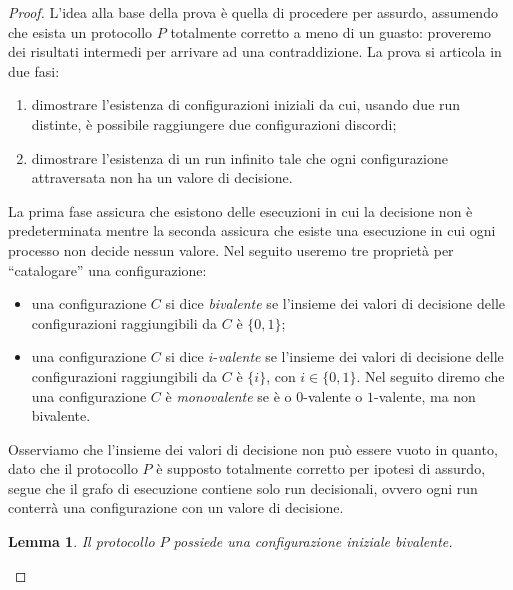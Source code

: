 \documentclass{article}
\newtheorem{lemma}{Lemma}
\begin{document}
\begin{proof}
  L'idea alla base della prova è quella di procedere per assurdo,
  assumendo che esista un protocollo $P$ totalmente corretto a meno di
  un guasto: proveremo dei risultati intermedi per arrivare ad una
  contraddizione. La prova si articola in due fasi:
  \begin{enumerate}
  \item dimostrare l'esistenza di configurazioni iniziali da cui,
    usando due run distinte, è possibile raggiungere due
    configurazioni discordi;
  \item dimostrare l'esistenza di un run infinito tale che ogni
    configurazione attraversata non ha un valore di decisione.
  \end{enumerate}
  La prima fase assicura che esistono delle esecuzioni in cui la
  decisione non è predeterminata mentre la seconda assicura che esiste
  una esecuzione in cui ogni processo non decide nessun valore.  Nel
  seguito useremo tre propriet\`a per ``catalogare'' una
  configurazione:
  \begin{itemize}
  \item una configurazione $C$ si dice \emph{bivalente} se l'insieme
    dei valori di decisione delle configurazioni raggiungibili da $C$
    è $\{0,1\}$;
  \item una configurazione $C$ si dice ${i}$-\emph{valente} se
    l'insieme dei valori di decisione delle configurazioni
    raggiungibili da $C$ è $\{i\}$, con $i\in \lbrace 0, 1
    \rbrace$. Nel seguito diremo che una configurazione $C$ \`e
    \emph{monovalente} se \`e o $0$-valente o $1$-valente, ma non
    bivalente.
  \end{itemize}

  Osserviamo che l'insieme dei valori di decisione non può essere
  vuoto in quanto, dato che il protocollo $P$ è supposto totalmente
  corretto per ipotesi di assurdo, segue che il grafo di esecuzione
  contiene solo run decisionali, ovvero ogni run conterrà una
  configurazione con un valore di decisione.

\begin{lemma}
\label{lemma:bivalentInitialConfigurationExists}
Il protocollo $P$ possiede una configurazione iniziale bivalente.
\end{lemma}


\end{proof}
\end{document}
